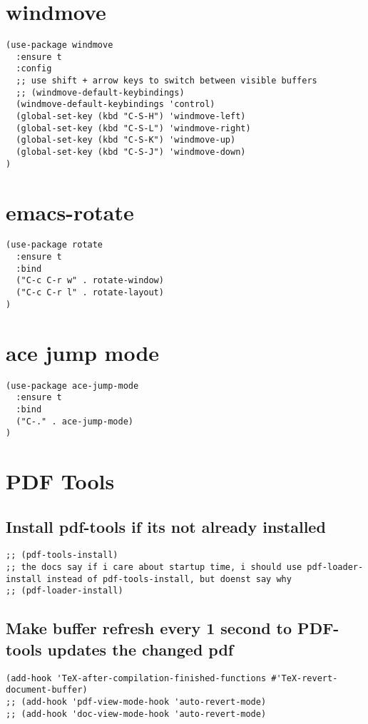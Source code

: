 \documentclass[11pt]{article}
\begin{document}
\section*{windmove}
\label{sec:org9366841}
\begin{verbatim}
(use-package windmove
  :ensure t
  :config
  ;; use shift + arrow keys to switch between visible buffers
  ;; (windmove-default-keybindings)
  (windmove-default-keybindings 'control)
  (global-set-key (kbd "C-S-H") 'windmove-left)
  (global-set-key (kbd "C-S-L") 'windmove-right)
  (global-set-key (kbd "C-S-K") 'windmove-up)
  (global-set-key (kbd "C-S-J") 'windmove-down)
)
\end{verbatim}

\section*{emacs-rotate}
\label{sec:org9f3cfab}

\begin{verbatim}
(use-package rotate
  :ensure t
  :bind
  ("C-c C-r w" . rotate-window)
  ("C-c C-r l" . rotate-layout)
)
\end{verbatim}

\section*{ace jump mode}
\label{sec:org002094c}

\begin{verbatim}
(use-package ace-jump-mode
  :ensure t
  :bind
  ("C-." . ace-jump-mode)
)
\end{verbatim}

\section*{PDF Tools}
\label{sec:org47a17c1}

\subsection*{Install pdf-tools if its not already installed}
\label{sec:org2cf7ed2}
\begin{verbatim}
;; (pdf-tools-install)
;; the docs say if i care about startup time, i should use pdf-loader-install instead of pdf-tools-install, but doenst say why
;; (pdf-loader-install)
\end{verbatim}

\subsection*{Make buffer refresh every 1 second to PDF-tools updates the changed pdf}
\label{sec:org66bbd17}
\begin{verbatim}
(add-hook 'TeX-after-compilation-finished-functions #'TeX-revert-document-buffer)
;; (add-hook 'pdf-view-mode-hook 'auto-revert-mode)
;; (add-hook 'doc-view-mode-hook 'auto-revert-mode)
\end{verbatim}
\end{document}
